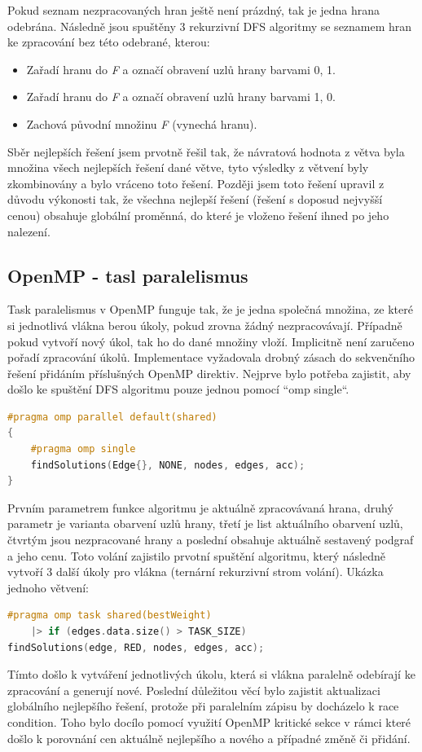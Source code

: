 \documentclass{article}%
\begin{document}
Pokud seznam nezpracovaných hran ještě není prázdný, tak je jedna hrana odebrána. Následně jsou spuštěny 3 rekurzivní DFS algoritmy se seznamem hran ke zpracování bez této odebrané, kterou:
\begin{itemize}
    \item Zařadí hranu do \textit{F} a označí obravení uzlů hrany barvami 0, 1.
    \item Zařadí hranu do \textit{F} a označí obravení uzlů hrany barvami 1, 0.
    \item Zachová původní množinu \textit{F} (vynechá hranu).
\end{itemize}%

Sběr nejlepších řešení jsem prvotně řešil tak, že návratová hodnota z větva byla množina všech nejlepších řešení dané větve, tyto výsledky z větvení byly zkombinovány a bylo vráceno toto řešení. Později jsem toto řešení upravil z důvodu výkonosti tak, že všechna nejlepší řešení (řešení s doposud nejvyšší cenou) obsahuje globální proměnná, do které je vloženo řešení ihned po jeho nalezení.


\subsection{OpenMP - tasl paralelismus}
Task paralelismus v OpenMP funguje tak, že je jedna společná množina, ze které si jednotlivá vlákna berou úkoly, pokud zrovna žádný nezpracovávají. Případně pokud vytvoří nový úkol, tak ho do dané množiny vloží. Implicitně není zaručeno pořadí zpracování úkolů.
Implementace vyžadovala drobný zásach do sekvenčního řešení přidáním příslušných OpenMP direktiv. Nejprve bylo potřeba zajistit, aby došlo ke spuštění DFS algoritmu pouze jednou pomocí ``omp single``.

\begin{lstlisting}[language=c++]
#pragma omp parallel default(shared)
{
    #pragma omp single
    findSolutions(Edge{}, NONE, nodes, edges, acc);
}
\end{lstlisting}

Prvním parametrem funkce algoritmu je aktuálně zpracovávaná hrana, druhý parametr je varianta obarvení uzlů hrany, třetí je list aktuálního obarvení uzlů, čtvrtým jsou nezpracované hrany a poslední obsahuje aktuálně sestavený podgraf a jeho cenu. Toto volání zajistilo prvotní spuštění algoritmu, který následně vytvoří 3 další úkoly pro vlákna (ternární rekurzivní strom volání). Ukázka jednoho větvení:
\begin{lstlisting}[language=c++]
#pragma omp task shared(bestWeight) 
    |> if (edges.data.size() > TASK_SIZE)
findSolutions(edge, RED, nodes, edges, acc);
\end{lstlisting}
Tímto došlo k vytváření jednotlivých úkolu, která si vlákna paralelně odebírají ke zpracování a generují nové. Poslední důležitou věcí bylo zajistit aktualizaci globálního nejlepšího řešení, protože při paralelním zápisu by docházelo k race condition. Toho bylo docílo pomocí využití OpenMP kritické sekce v rámci které došlo k porovnání cen aktuálně nejlepšího a nového a případné změně či přidání.
\end{document}

